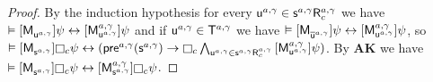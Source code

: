 \begin{proof}
By the induction hypothesis for every $\aStateU[\agentA, \gamma] \in \aSuccessorsC[\agentA, \gamma]{\aStateS[\agentA, \gamma]}$ we have $\entails \actionA{\aPModel{\aStateU[\agentA, \gamma]}} \psi \iff \actionA{\aPModel[\agentA, \gamma]{\aStateU[\agentA, \gamma]}} \psi$ and if $\aStateU[\agentA, \gamma] \in \aStatesT[\agentA, \gamma]$ we have $\entails \actionA{\aPModel{\aPStateU[\agentA, \gamma]}} \psi \iff \actionA{\aPModel[\agentA, \gamma]{\aStateU[\agentA, \gamma]}} \psi$, so $\entails \actionA{\aPModel{\aStateS[\agentA, \gamma]}} \necessaryC \psi \iff (\aPrecondition[\agentA, \gamma](\aStateS[\agentA, \gamma]) \implies \necessaryC \bigwedge_{\aStateU[\agentA, \gamma] \in \aSuccessorsC[\agentA, \gamma]{\aStateS[\agentA, \gamma]}} \actionA{\aPModel[\agentA, \gamma]{\aStateU[\agentA, \gamma]}} \psi)$.
By {\bf AK} we have $\entails \actionA{\aPModel{\aStateS[\agentA, \gamma]}} \necessaryC \psi \iff \actionA{\aPModel[\agentA, \gamma]{\aStateS[\agentA, \gamma]}} \necessaryC \psi$.


\end{proof}
